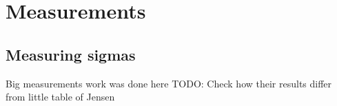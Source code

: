 \chapter{Measurements}
\label{chapter:measurements}


\section{Measuring sigmas}
Big measurements work was done here \cite{Gkioulekas:2013:IVR:2508363.2508377}
TODO: Check how their results differ from little table of Jensen
\cite{Jensen:2001:PMS:383259.383319}

